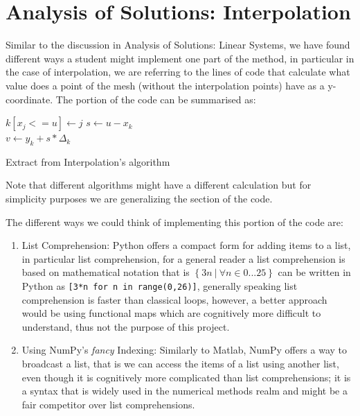 \section{Analysis of Solutions: Interpolation}
Similar to the discussion in Analysis of Solutions: Linear Systems, we have found different ways a student might implement one part of the method, in particular in the case of interpolation, we are referring to the lines of code that calculate what value does a point of the mesh (without the interpolation points) have as a y-coordinate. The portion of the code can be summarised as: 


\begin{algorithm}[H]
\SetAlgoLined
{} {
$k[x_j <= u] \gets j$
}
$s \gets u - x_k$\\
$v \gets y_k + s * \Delta_k$

\caption{Extract from Interpolation's algorithm}
\end{algorithm}
Note that different algorithms might have a different calculation but for simplicity purposes we are generalizing the section of the code.


The different ways we could think of implementing this portion of the code are:
\begin{enumerate}
    \item List Comprehension: Python offers a compact form for adding items to a list, in particular list comprehension, for a general reader a list comprehension is based on mathematical notation that is $\left\{ 3n\ |\ \forall n\in 0...25\right\}$ can be written in Python as \lstinline|[3*n for n in range(0,26)]|, generally speaking list comprehension is faster than classical loops\cite{PythonSpeedPerformanceTips}, however, a better approach would be using functional maps which are cognitively more difficult to understand, thus not the purpose of this project.

    \item Using NumPy's \textit{fancy} Indexing: Similarly to Matlab, NumPy offers a way to broadcast a list, that is we can access the items of a list using another list, even though it is cognitively more complicated than list comprehensions; it is a syntax that is widely used in the numerical methods realm and might be a fair competitor over list comprehensions.
    
\end{enumerate}
